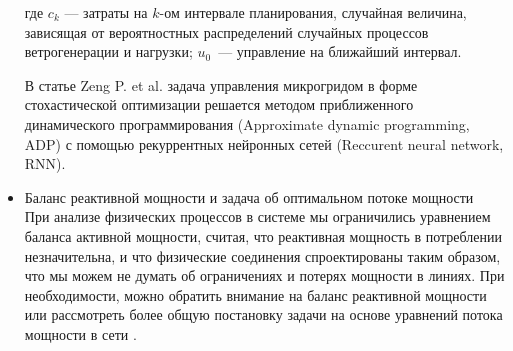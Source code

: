 \begin{itemize}
    где $c_k$ --- затраты на $k$-ом интервале планирования, случайная величина, зависящая от вероятностных распределений случайных процессов ветрогенерации и нагрузки; $u_0$~--- управление на ближайший интервал.
    
    
    В статье Zeng P. et al. \cite{zeng2018dynamic} задача управления микрогридом в форме стохастической оптимизации решается методом приближенного динамического программирования (Approximate dynamic programming, ADP) с помощью рекуррентных нейронных сетей (Reccurent neural network, RNN).
    
    
    
    \item Баланс реактивной мощности и задача об оптимальном потоке мощности\\
    При анализе физических процессов в системе мы ограничились уравнением баланса активной мощности, считая, что реактивная мощность в потреблении незначительна, и что физические соединения спроектированы таким образом, что мы можем не думать об ограничениях и потерях мощности в линиях.
    При необходимости, можно обратить внимание на баланс реактивной мощности \cite{zhang2016reactive} или рассмотреть более общую постановку задачи на основе уравнений потока мощности в сети \cite{kim2000comparison, molzahn2017survey}.
    
\end{itemize}
